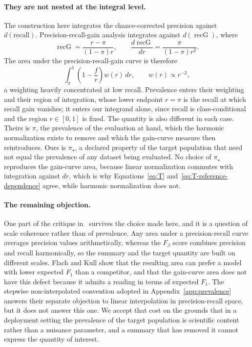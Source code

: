 \documentclass[11pt]{article}
\theoremstyle{remark}
\begin{document}
\paragraph{They are not nested at the integral level.}
The construction here integrates the chance-corrected precision against $d(\text{recall})$. Precision-recall-gain analysis integrates against $d(\operatorname{recG})$, where
\[
\operatorname{recG}
=
\frac{r-\pi}{(1-\pi)r},
\qquad
\frac{d\operatorname{recG}}{dr}
=
\frac{\pi}{(1-\pi)r^{2}}.
\]
The area under the precision-recall-gain curve is therefore
\[
\int_{\pi}^{1}
\left(1-\frac{f}{r}\right)
w(r)\,dr,
\qquad
w(r)\propto r^{-2},
\]
a weighting heavily concentrated at low recall. Prevalence enters their weighting and their region of integration, whose lower endpoint $r=\pi$ is the recall at which recall gain vanishes; it enters our integrand alone, since recall is class-conditional and the region $r\in[0,1]$ is fixed. The quantity is also different in each case. Theirs is $\pi$, the prevalence of the evaluation at hand, which the harmonic normalization exists to remove and which the gain-curve measure then reintroduces. Ours is $\pi_\star$, a declared property of the target population that need not equal the prevalence of any dataset being evaluated. No choice of $\pi_\star$ reproduces the gain-curve area, because linear normalization commutes with integration against $dr$, which is why Equations~\eqref{eq:T} and~\eqref{eq:T-reference-dependence} agree, while harmonic normalization does not.
\paragraph{The remaining objection.}
One part of the critique in~\cite{flach2015prg} survives the choice made here, and it is a question of scale coherence rather than of prevalence. Any area under a precision-recall curve averages precision values arithmetically, whereas the $F_\beta$ score combines precision and recall harmonically, so the summary and the target quantity are built on different scales. Flach and Kull show that the resulting area can prefer a model with lower expected $F_1$ than a competitor, and that the gain-curve area does not have this defect because it admits a reading in terms of expected $F_1$. The stepwise non-interpolated convention adopted in Appendix~\ref{app:prevalence} answers their separate objection to linear interpolation in precision-recall space, but it does not answer this one. We accept that cost on the grounds that in a deployment setting the prevalence of the target population is scientific content rather than a nuisance parameter, and a summary that has removed it cannot express the quantity of interest.
\end{document}
